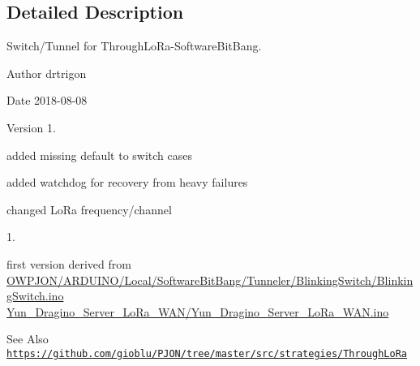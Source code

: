 \subsection{Detailed Description}
Switch/\-Tunnel for Through\-Lo\-Ra-\/\-Software\-Bit\-Bang. \begin{DoxyAuthor}{Author}
drtrigon 
\end{DoxyAuthor}
\begin{DoxyDate}{Date}
2018-\/08-\/08 
\end{DoxyDate}
\begin{DoxyVersion}{Version}
1. \begin{DoxyItemize}
\item added missing default to switch cases \item added watchdog for recovery from heavy failures \item changed Lo\-Ra frequency/channel \end{DoxyItemize}


1. \begin{DoxyItemize}
\item first version derived from \hyperlink{BlinkingSwitch_8ino}{O\-W\-P\-J\-O\-N/\-A\-R\-D\-U\-I\-N\-O/\-Local/\-Software\-Bit\-Bang/\-Tunneler/\-Blinking\-Switch/\-Blinking\-Switch.\-ino} \hyperlink{Yun__Dragino__Server__LoRa__WAN_8ino}{Yun\-\_\-\-Dragino\-\_\-\-Server\-\_\-\-Lo\-Ra\-\_\-\-W\-A\-N/\-Yun\-\_\-\-Dragino\-\_\-\-Server\-\_\-\-Lo\-Ra\-\_\-\-W\-A\-N.\-ino} \end{DoxyItemize}

\end{DoxyVersion}
\begin{DoxySeeAlso}{See Also}
\href{https://github.com/gioblu/PJON/tree/master/src/strategies/ThroughLoRa}{\tt https\-://github.\-com/gioblu/\-P\-J\-O\-N/tree/master/src/strategies/\-Through\-Lo\-Ra}
\end{DoxySeeAlso}
